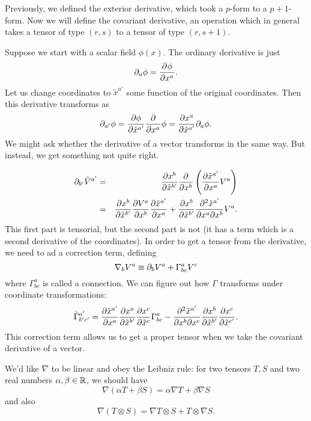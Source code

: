 Previously, we defined the exterior derivative, which took a $p$-form to a $p+1$-form. Now we will define the covariant derivative, an operation which in general takes a tensor of type $(r,s)$ to a tensor of type $(r,s+1)$.

Suppose we start with a scalar field $\phi(x)$. The ordinary derivative is just
$$\partial_a \phi=\frac{\partial^{} {\phi}}{\partial {{x^a}} ^{}}.$$
Let us change coordinates to ${\tilde x^{a'}}$ some function of the original coordinates. Then this derivative transforms as
$$\partial_{a'}\phi= \frac{\partial \phi}{\partial {\tilde x}^{a'}} \frac{\partial^{} {}}{\partial {x^a} ^{}}\phi = \frac{\partial x^a}{\partial {\tilde x}^{a'}}\partial_a \phi.$$
We might ask whether the derivative of a vector transforms in the same way. But instead, we get something not quite right.

\begin{eqnarray*}
\partial_{b'} \tilde V^{a'} &=& \frac{\partial x^b}{\partial \tilde x^{b'}} \frac{\partial^{} {}}{\partial {x^b} ^{}}\left( \frac{ \partial \tilde x^{a'}}{\partial x^a} V^a\right)\\
&=&\frac{\partial x^b}{\partial \tilde x^{b'}}\frac{\partial V^a}{\partial x^b} \frac{\partial \tilde x^{a'}}{\partial x^a} + \frac{\partial x^b}{\partial \tilde x^{b'}}\frac{\partial^2 \tilde x^{a'}}{\partial x^a \partial x^b}V^a.
\end{eqnarray*}
This first part is tensorial, but the second part is not (it has a term which is a second derivative of the coordinates). In order to get a tensor from the derivative, we need to ad a correction term, defining
$$\nabla_b V^a \equiv \partial_b V^a +\Gamma^a_{bc} V^c$$
where $\Gamma^a_{bc}$ is called a connection. We can figure out how $\Gamma$ transforms under coordinate transformations:
$$\tilde \Gamma^{a'}_{b'c'}=\frac{\partial \tilde x^{a'}}{\partial x^a} \frac{ \partial x^a}{\partial \tilde x^{b'}}\frac{\partial x^c}{\partial \tilde x^c} \Gamma^a_{bc}-\frac{\partial^2 \tilde x^{a'}}{\partial x^b \partial x^c}\frac{\partial x^b}{\partial \tilde x^{b'}}\frac{\partial x^c}{\partial\tilde x^{c'}}.$$
This correction term allows us to get a proper tensor when we take the covariant derivative of a vector.

We'd like $\nabla$ to be linear and obey the Leibniz rule: for two tensors $T,S$ and two real numbers $\alpha,\beta\in \mathbb{R}$, we should have
$$\nabla(\alpha T+\beta S)= \alpha \nabla T+\beta \nabla S$$
and also
$$\nabla(T\otimes S)=\nabla T \otimes S + T\otimes \nabla S.$$

